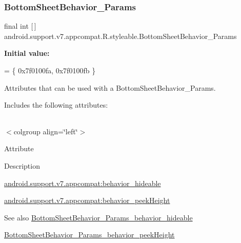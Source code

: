 \subsubsection{\texorpdfstring{Bottom\+Sheet\+Behavior\+\_\+\+Params}{BottomSheetBehavior\_Params}}
{\footnotesize\ttfamily final int \mbox{[}$\,$\mbox{]} android.\+support.\+v7.\+appcompat.\+R.\+styleable.\+Bottom\+Sheet\+Behavior\+\_\+\+Params\hspace{0.3cm}{\ttfamily [static]}}

{\bfseries Initial value\+:}
\begin{DoxyCode}
= \{
            0x7f0100fa, 0x7f0100fb
        \}
\end{DoxyCode}
Attributes that can be used with a Bottom\+Sheet\+Behavior\+\_\+\+Params. 

Includes the following attributes\+:

\tabulinesep=1mm
\begin{longtabu} spread 0pt [c]{*{0}{|X[-1]}|}
\hline
\end{longtabu}
$<$colgroup align=\char`\"{}left\char`\"{}$>$ 

Attribute

Description 

{\ttfamily \hyperlink{classandroid_1_1support_1_1v7_1_1appcompat_1_1R_1_1styleable_a858d753f704250c67e60a9a949fb1713}{android.\+support.\+v7.\+appcompat\+:behavior\+\_\+hideable}}

{\ttfamily \hyperlink{classandroid_1_1support_1_1v7_1_1appcompat_1_1R_1_1styleable_a6da8e778122e08e2149ff3d5f02d8f79}{android.\+support.\+v7.\+appcompat\+:behavior\+\_\+peek\+Height}}

\begin{DoxySeeAlso}{See also}
\hyperlink{classandroid_1_1support_1_1v7_1_1appcompat_1_1R_1_1styleable_a858d753f704250c67e60a9a949fb1713}{Bottom\+Sheet\+Behavior\+\_\+\+Params\+\_\+behavior\+\_\+hideable} 

\hyperlink{classandroid_1_1support_1_1v7_1_1appcompat_1_1R_1_1styleable_a6da8e778122e08e2149ff3d5f02d8f79}{Bottom\+Sheet\+Behavior\+\_\+\+Params\+\_\+behavior\+\_\+peek\+Height} 
\end{DoxySeeAlso}
\mbox{\label{classandroid_1_1support_1_1v7_1_1appcompat_1_1R_1_1styleable_a858d753f704250c67e60a9a949fb1713}} 
